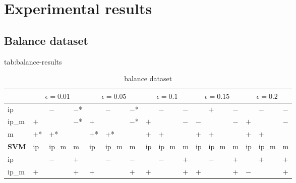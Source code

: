 \section{Experimental results}
\label{sec:experiments}

\subsection{Balance dataset}


\begin{table}[htbp]
\scriptsize
\floatconts
  {tab:balance-results}%
  {\caption{balance dataset}}%
  {
\begin{tabular}{l|lll|lll|lll|lll|lll}
             & \multicolumn{3}{c|}{$\epsilon=0.01$} & \multicolumn{3}{c|}{$\epsilon=0.05$} & \multicolumn{3}{c|}{$\epsilon=0.1$} & \multicolumn{3}{c|}{$\epsilon=0.15$} & \multicolumn{3}{c}{$\epsilon=0.2$} \\
\hline
\hline
ip           &            & $-$        & $-$*       &            & $-$        & $-$*       &            & $-$        & $-$        &            & $+$        & $-$        &            & $-$        & $-$         \\
ip\_m        & $+$        &            & $-$*       & $+$        &            & $-$*       & $+$        &            & $-$        & $-$        &            & $-$        & $+$        &            & $-$         \\
m            & $+$*       & $+$*       &            & $+$*       & $+$*       &            & $+$        & $+$        &            & $+$        & $+$        &            & $+$        & $+$        &             \\
\hline
\textbf{SVM} & ip         & ip\_m      & m          & ip         & ip\_m      & m          & ip         & ip\_m      & m          & ip         & ip\_m      & m          & ip         & ip\_m      & m           \\
\hline
ip           &            & $-$        & $+$        &            & $-$        & $-$        &            & $-$        & $+$        &            & $-$        & $+$        &            & $+$        & $+$         \\
ip\_m        & $+$        &            & $+$        & $+$        &            & $+$        & $+$        &            & $+$        & $+$        &            & $+$        & $-$        &            & $+$         \\

\end{tabular}}
\end{table}
